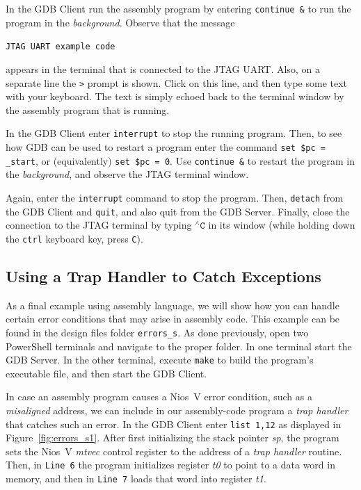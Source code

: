 \documentclass[11pt, twoside, pdftex]{article}
\begin{document}
In the GDB Client run the assembly program by entering \texttt{continue \&} to run the
program in the {\it background}. Observe that the message 

\texttt{JTAG UART example code}

appears in the terminal that is connected to the
JTAG UART. Also, on a separate line the \texttt{>} prompt is shown. Click on this line,
and then type some text with your keyboard. The text is simply echoed back to the terminal
window by the assembly program that is running. 

In the GDB Client enter \texttt{interrupt} to stop the running program. Then, to see how GDB can
be used to restart a program enter the command \texttt{set \$pc = \_start}, or
(equivalently) \texttt{set \$pc = 0}. Use \texttt{continue \&} to restart the program in 
the {\it background}, and observe the JTAG terminal window. 

Again, enter the \texttt{interrupt} command to stop the program. Then, \texttt{detach} 
from the GDB Client and \texttt{quit}, and also quit from the GDB Server. Finally, close 
the connection to the JTAG terminal by typing $^{\wedge}\texttt{C}$ in its window
(while holding down the \texttt{ctrl} keyboard key, press \texttt{C}).

\subsection{Using a Trap Handler to Catch Exceptions}

As a final example using assembly language, we will show how you can handle certain error
conditions that may arise in assembly code.  This example can be found in the design files folder
\texttt{errors\_s}.  As done previously, open two PowerShell terminals and navigate to
the proper folder. In one terminal start the GDB Server. In the other terminal, 
execute \texttt{make} to build the program's executable file, and then start the GDB Client.

In case an assembly program causes a Nios~V error condition, such as a {\it misaligned} address,
we can include in our assembly-code program a {\it trap handler} that catches such an error. 
In the GDB Client enter \texttt{list 1,12} as displayed in Figure~\ref{fig:errors_s1}.
After first initializing the stack pointer {\it sp}, the program sets the Nios~V {\it mtvec}
control register to the address of a {\it trap handler} routine. Then, in \texttt{Line 6} the
program initializes register {\it t0} to point to a data word in memory, and then in
\texttt{Line 7} loads that word into register {\it t1}. 
\end{document}

